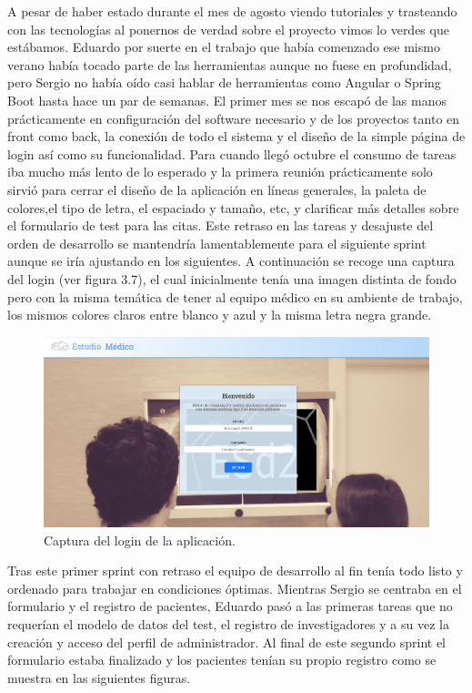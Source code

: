 A pesar de haber estado durante el mes de agosto viendo tutoriales y trasteando con las tecnologías al ponernos de verdad sobre el proyecto vimos lo verdes que estábamos. Eduardo por suerte en el trabajo que había comenzado ese mismo verano había tocado parte de las herramientas aunque no fuese en profundidad, pero Sergio no había oído casi hablar de herramientas como Angular o Spring Boot hasta hace un par de semanas. El primer mes se nos escapó de las manos prácticamente en configuración del software necesario y de los proyectos tanto en front como back, la conexión de todo el sistema y el diseño de la simple página de login así como su funcionalidad. Para cuando llegó octubre el consumo de tareas iba mucho más lento de lo esperado y la primera reunión prácticamente solo sirvió para cerrar el diseño de la aplicación en líneas generales, la paleta de colores,el tipo de letra, el espaciado y tamaño, etc, y clarificar más detalles sobre el formulario de test para las citas. Este retraso en las tareas y desajuste del orden de desarrollo se mantendría lamentablemente para el siguiente sprint aunque se iría ajustando en los siguientes. A continuación se recoge una captura del login (ver figura 3.7), el cual inicialmente tenía una imagen distinta de fondo pero con la misma temática de tener al equipo médico en su ambiente de trabajo, los mismos colores claros entre blanco y azul y la misma letra negra grande.
\newline

 \begin{figure}[h]
    \centering
     \includegraphics[width=1\textwidth]{images/login.jpg}
    \caption{Captura del login de la aplicación.}
\end{figure}
\newpage

Tras este primer sprint con retraso el equipo de desarrollo al fin tenía todo listo y ordenado para trabajar en condiciones óptimas. Mientras Sergio se centraba en el formulario y el registro de pacientes, Eduardo pasó a las primeras tareas que no requerían el modelo de datos del test, el registro de investigadores y a su vez la creación y acceso del perfil de administrador. Al final de este segundo sprint el formulario estaba finalizado y los pacientes tenían su propio registro como se muestra en las siguientes figuras.
\newline

